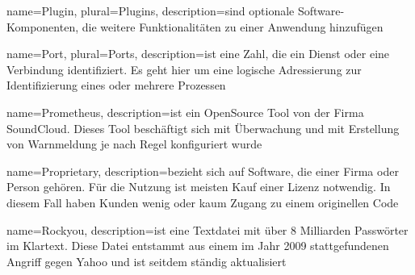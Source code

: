 
 {
    name={Plugin},
    plural={Plugins},
    description={sind optionale Software-Komponenten, die weitere Funktionalitäten zu einer Anwendung hinzufügen \citep{ITS_Network}}}

 {
    name={Port},
    plural={Ports},
    description={ist eine Zahl, die ein Dienst oder eine Verbindung identifiziert. Es geht hier um eine logische Adressierung zur Identifizierung eines oder mehrere Prozessen \citep{Tanembaum_CN}}}

 {
    name={Prometheus},
    description={ist ein OpenSource Tool von der Firma SoundCloud. Dieses Tool beschäftigt sich mit Überwachung und mit Erstellung von Warnmeldung je nach Regel konfiguriert wurde \citep{Prometheus_doc}}}

 {
    name={Proprietary},
    description={bezieht sich auf Software, die einer Firma oder Person gehören. Für die Nutzung ist meisten Kauf einer Lizenz notwendig. In diesem Fall haben Kunden wenig oder kaum Zugang zu einem originellen Code \citep{Nexcess_P}}}



 {
    name={Rockyou},
    description={ist eine Textdatei mit über 8 Milliarden Passwörter im Klartext. Diese Datei entstammt aus einem im Jahr 2009 stattgefundenen Angriff gegen Yahoo und ist seitdem ständig aktualisiert \citep{Mikalauskas_rockyou}}}


